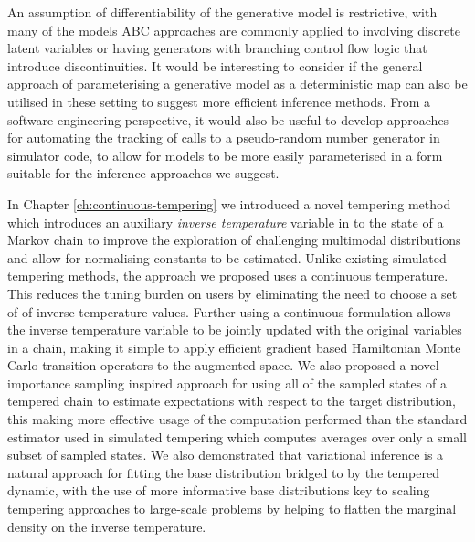 An assumption of differentiability of the generative model is restrictive, with many of the models \ac{ABC} approaches are commonly applied to involving discrete latent variables or having generators with branching control flow logic that introduce discontinuities. It would be interesting to consider if the general approach of parameterising a generative model as a deterministic map can also be utilised in these setting to suggest more efficient inference methods. From a software engineering perspective, it would also be useful to develop approaches for automating the tracking of calls to a pseudo-random number generator in simulator code, to allow for models to be more easily parameterised in a form suitable for the inference approaches we suggest. %

In Chapter \ref{ch:continuous-tempering} we introduced a novel tempering method which introduces an auxiliary \emph{inverse temperature} variable in to the state of a Markov chain to improve the exploration of challenging multimodal distributions and allow for normalising constants to be estimated. Unlike existing simulated tempering methods, the approach we proposed uses a continuous temperature. This reduces the tuning burden on users by eliminating the need to choose a set of of inverse temperature values. Further using a continuous formulation allows the inverse temperature variable to be jointly updated with the original variables in a chain, making it simple to apply efficient gradient based Hamiltonian Monte Carlo transition operators to the augmented space. We also proposed a novel importance sampling inspired approach for using all of the sampled states of a tempered chain to estimate expectations with respect to the target distribution, this making more effective usage of the computation performed than the standard estimator used in simulated tempering which computes averages over only a small subset of sampled states. We also demonstrated that variational inference is a natural approach for fitting the base distribution bridged to by the tempered dynamic, with the use of more informative base distributions key to scaling tempering approaches to large-scale problems by helping to flatten the marginal density on the inverse temperature.

